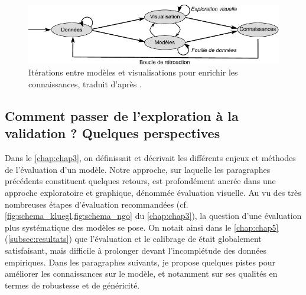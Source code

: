 \begin{figure}[H]
	\centering
	\includegraphics[width=.9\linewidth]{img/schema_keim.pdf}
	\caption[Itérations entre modèles et visualisations pour enrichir les connaissances.]{Itérations entre modèles et visualisations pour enrichir les connaissances, traduit d'après \textcite[fig.~1, p.~156]{keim_visual_2008}.}
	\label{fig:schema-va}
\end{figure}
\clearpage


\subsection{Comment passer de l'exploration à la validation ? Quelques perspectives \label{subsec:perspectives-validation}}

Dans le \cref{chap:chap3}, on définissait et décrivait les différents enjeux et méthodes de l'évaluation d'un modèle.
Notre approche, sur laquelle les paragraphes précédents constituent quelques retours, est profondément ancrée dans une approche exploratoire et graphique, dénommée \og évaluation visuelle\fg{}.
Au vu des très nombreuses étapes d'évaluation recommandées (cf. \cref{fig:schema_kluegl,fig:schema_ngo} du \cref{chap:chap3}), la question d'une évaluation plus systématique des modèles se pose.
On notait ainsi dans le \cref{chap:chap5} (\cref{subsec:resultats}) que l'évaluation et le calibrage de \simfeodal{} était globalement satisfaisant, mais difficile à prolonger devant l'incomplétude des données empiriques.
Dans les paragraphes suivants, je propose quelques pistes pour améliorer les connaissances sur le modèle, et notamment sur ses qualités en termes de robustesse et de généricité.

